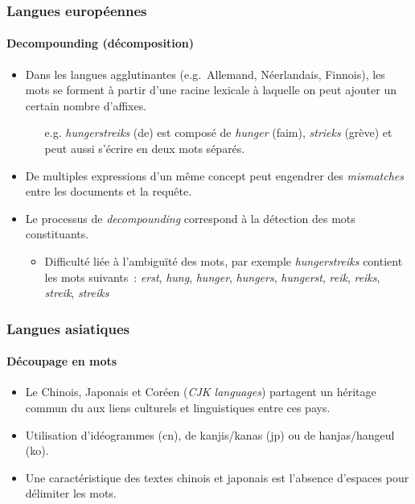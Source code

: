 \documentclass[12pt,aspectratio=43,dvipsnames,table]{beamer}
\begin{document}
\begin{frame}
    \frametitle{Langues européennes}
    \framesubtitle{Decompounding (décomposition)}
    \begin{itemize} \itemsep10pt
        \item Dans les langues agglutinantes (e.g.~Allemand, Néerlandais, 
              Finnois), les mots se forment à partir d'une racine lexicale à 
              laquelle on peut ajouter un certain nombre d'affixes.
        \begin{itemize}
            \item[e.g.] \textit{hungerstreiks} (de) est composé de 
                  \textit{hunger} (faim), \textit{strieks} (grève) et peut aussi
                  s'écrire en deux mots séparés.
        \end{itemize}
        \item De multiples expressions d'un même concept peut engendrer des 
              \textit{mismatches} entre les documents et la requête.
        \item Le processus de \textit{decompounding} correspond à la détection 
              des mots constituants.
        \begin{itemize}
            \item Difficulté liée à l'ambiguïté des mots, par exemple 
                  \textit{hungerstreiks} contient les mots suivants~: 
                  \textit{erst}, \textit{hung}, \textit{hunger}, 
                  \textit{hungers}, \textit{hungerst}, \textit{reik}, 
                  \textit{reiks}, \textit{streik}, \textit{streiks}
        \end{itemize} 
    \end{itemize}
\end{frame}


\begin{frame}
    \frametitle{Langues asiatiques}
    \framesubtitle{Découpage en mots}
    \begin{itemize} \itemsep10pt
        \item Le Chinois, Japonais et Coréen (\textit{CJK languages}) partagent 
              un héritage commun du aux liens culturels et linguistiques entre 
              ces pays.
        \item Utilisation d'idéogrammes (cn), de kanjis/kanas (jp) ou de 
              hanjas/hangeul (ko).
        \item Une caractéristique des textes chinois et japonais est l'absence 
              d'espaces pour délimiter les mots.
    \end{itemize}
\end{frame}
\end{document}
